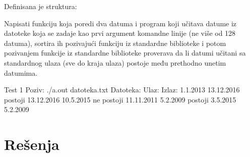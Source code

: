 \begin{Exercise}[label=516]
  Definisana je struktura:
  \begin{ckod}
    typedef struct { int dan; int mesec; int godina; } Datum;}
  \end{ckod}
  Napisati funkciju koja poredi dva datuma i program koji učitava
  datume iz datoteke koja se zadaje kao prvi argument komandne linije
  (ne više od 128 datuma), sortira ih pozivajući funkciju
   iz standardne biblioteke i potom pozivanjem funkcije
   iz standardne biblioteke proverava da li datumi
  učitani sa standardnog ulaza (sve do kraja ulaza) postoje među
  prethodno unetim datumima.
  
\begin{maxitest}
\begin{test}{Test 1}
Poziv: ./a.out datoteka.txt
Datoteka:            Ulaz:             Izlaz:
1.1.2013             13.12.2016        postoji
13.12.2016           10.5.2015         ne postoji
11.11.2011           5.2.2009          postoji
3.5.2015
5.2.2009
\end{test}
\end{maxitest}
  
\end{Exercise}




\section{Rešenja}
\shipoutAnswer


